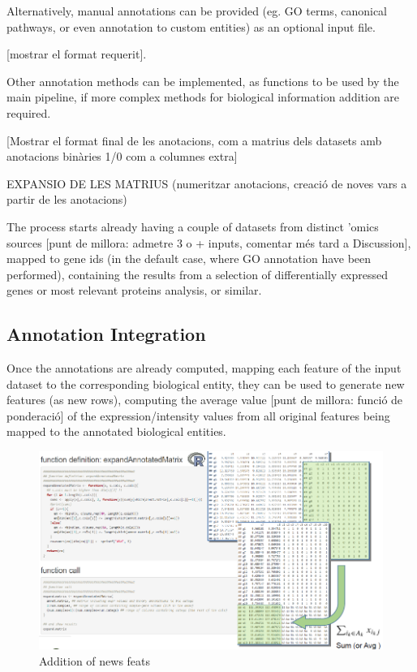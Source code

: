 \documentclass[a4paper, nobind]{templates/ociamthesis}
\begin{document}
Alternatively, manual annotations can be provided (eg. GO terms, canonical pathways, or even annotation to custom entities) as an optional input file.

{[}mostrar el format requerit{]}.

Other annotation methods can be implemented, as functions to be used by the main pipeline, if more complex methods for biological information addition are required.

{[}Mostrar el format final de les anotacions, com a matrius dels datasets amb anotacions binàries 1/0 com a columnes extra{]}

EXPANSIO DE LES MATRIUS (numeritzar anotacions, creació de noves vars a partir de les anotacions)

The process starts already having a couple of datasets from distinct 'omics sources {[}punt de millora: admetre 3 o + inputs, comentar més tard a Discussion{]}, mapped to gene ids (in the default case, where GO annotation have been performed), containing the results from a selection of differentially expressed genes or most relevant proteins analysis, or similar.

\clearpage

\hypertarget{biointegration}{%
\subsection{Annotation Integration}\label{biointegration}}

Once the annotations are already computed, mapping each feature of the input dataset to the corresponding biological entity, they can be used to generate new features (as new rows), computing the average value {[}punt de millora: funció de ponderació{]} of the expression/intensity values from all original features being mapped to the annotated biological entities.

\begin{figure}

{\centering \includegraphics[width=0.95\linewidth]{figures/chapter3/3-2_addition_of_new_feats} 

}

\caption{Addition of news feats}\label{fig:fig3-2}
\end{figure}
\end{document}
